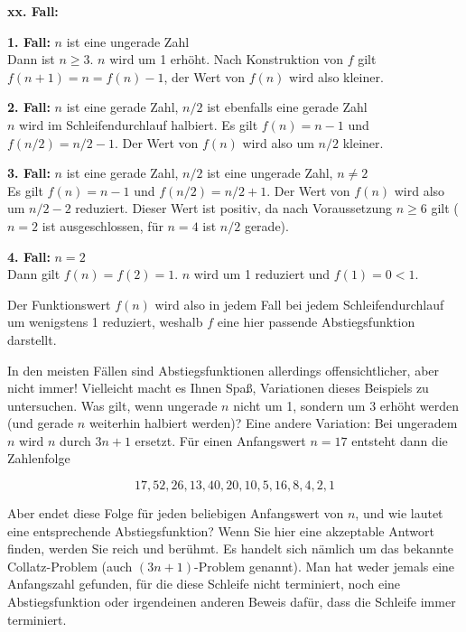 \begin{addmargin}[25pt]{25pt}
\begin{labeling}{{\textbf{xx. Fall:}}} %
	\item[\textbf{1. Fall:}] $n$ ist eine ungerade Zahl \\
		Dann ist $n \geq 3$. $n$ wird um 1 erhöht. Nach Konstruktion von $f$ gilt $f(n+1) = n = f(n)-1$, der Wert von $f(n)$ wird also kleiner.
	\item[\textbf{2. Fall:}] $n$ ist eine gerade Zahl, $n/2$ ist ebenfalls eine gerade Zahl \\
		$n$ wird im Schleifendurchlauf halbiert. Es gilt $f (n) = n-1 $ und $f(n/2) = n/2 -1$. Der Wert von $f(n)$ wird also um $n/2$ kleiner.
	\item[\textbf{3. Fall:}] $n$ ist eine gerade Zahl, $n/2$ ist eine ungerade Zahl, $n \neq 2$ \\
		Es gilt $f(n) = n-1$ und $f(n/2) = n/2 +1$. Der Wert von $f(n)$ wird also um $n/2 - 2$ reduziert. Dieser Wert ist positiv, da nach Voraussetzung $n\geq 6$ gilt ($n=2$ ist ausgeschlossen, für $n= 4$ ist $n/2$ gerade).
	\item[\textbf{4. Fall:}] $n=2$ \\
		Dann gilt $f(n)= f(2)= 1$. $n$ wird um 1 reduziert und 
		\linebreak
		$f(1) = 0<1$.
\end{labeling}
\end{addmargin}

\vspace{\baselineskip}

Der Funktionswert $f(n)$ wird also in jedem Fall bei jedem Schleifendurchlauf um wenigstens 1 reduziert, weshalb $f$ eine hier passende Abstiegsfunktion darstellt.

In den meisten Fällen sind Abstiegsfunktionen allerdings offensichtlicher, aber nicht immer! Vielleicht macht es Ihnen Spaß, Variationen dieses Beispiels zu untersuchen. Was gilt, wenn ungerade $n$ nicht um 1, sondern um 3 erhöht werden (und gerade $n$ weiterhin halbiert werden)? Eine andere Variation: Bei ungeradem $n$ wird $n$ durch $3n + 1$ ersetzt. Für einen Anfangswert $n=17$ entsteht dann die Zahlenfolge

$$ 17, 52, 26, 13, 40, 20, 10, 5, 16, 8, 4, 2, 1$$

Aber endet diese Folge für jeden beliebigen Anfangswert von $n$, und wie lautet eine entsprechende Abstiegsfunktion? Wenn Sie hier eine akzeptable Antwort finden, werden Sie reich und berühmt. Es handelt sich nämlich um das bekannte Collatz-Problem 
(auch $(3n+1)$-Problem genannt). Man hat weder jemals eine Anfangszahl gefunden, für die diese Schleife nicht terminiert, noch eine Abstiegsfunktion oder irgendeinen anderen Beweis dafür, dass die Schleife immer terminiert.

